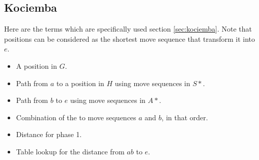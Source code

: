 \subsection{Kociemba}
Here are the terms which are specifically used section \ref{sec:kociemba}. Note that positions can be considered as the shortest move sequence that transform it into $e$.
\begin{itemize}
\item {}A position in $G$.
\item {}Path from $a$ to a position in $H$ using move sequences in $S*$.
\item {}Path from $b$ to $e$ using move sequences in $A*$.
\item {}Combination of the to move sequences $a$ and $b$, in that order.
\item {}Distance for phase 1.
\item {}Table lookup for the distance from $ab$ to $e$.
\end{itemize}


